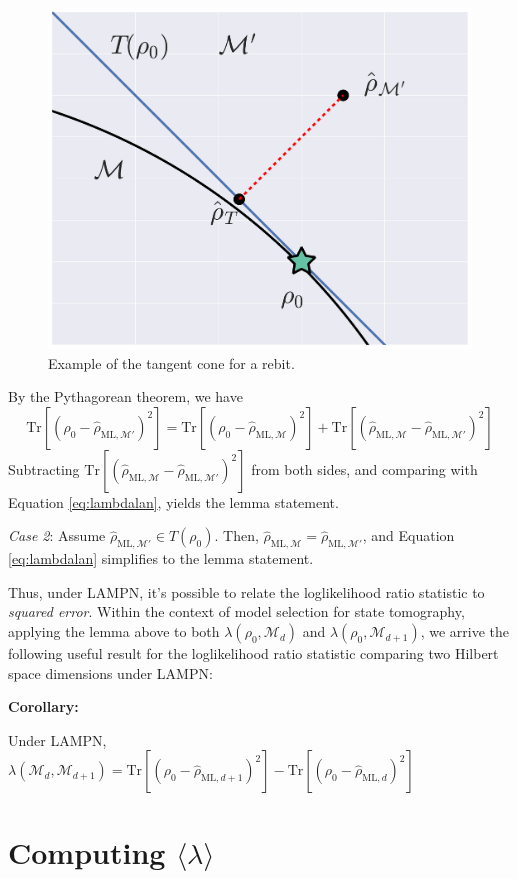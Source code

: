 \documentclass[aps,pra, twocolumn]{revtex4-1}
\newcommand{\M}{\mathcal{M}}
\newcommand{\rhohat}{\hat{\rho}}
\newcommand{\rhoML}[1]{\rhohat_{\scriptscriptstyle{\mathrm{ML},#1}}}
\begin{document}
\begin{figure}
\includegraphics[width=\columnwidth]{Images/Figure_temp.pdf}
 \caption{Example of the tangent cone for a rebit.}
\label{fig:tangentcone}
\end{figure}

 By the Pythagorean theorem, we have
\[\mathrm{Tr}[(\rho_{0} -\rhoML{\M'})^{2}] =  \mathrm{Tr}[(\rho_{0} - \rhoML{\M})^{2}] + \mathrm{Tr}[(\rhoML{\M} - \rhoML{\M'})^{2}]\]
Subtracting $\mathrm{Tr}[(\rhoML{\M} - \rhoML{\M'})^{2}]$ from both sides, and comparing with Equation \eqref{eq:lambdalan}, yields the lemma statement.

\emph{Case 2}: Assume $\rhoML{\M'} \in T(\rho_{0})$. Then, $\rhoML{\M}= \rhoML{\M'}$, and Equation \eqref{eq:lambdalan} simplifies to the lemma statement.

Thus, under LAMPN, it's possible to relate the loglikelihood ratio statistic to \emph{squared error}. Within the context of model selection for state tomography, applying the lemma above to both $\lambda(\rho_{0},\M_{d})$ and $\lambda(\rho_{0},\M_{d+1})$, we arrive the following useful result for the loglikelihood ratio statistic comparing two Hilbert space dimensions under LAMPN:

\textbf{Corollary:}

Under LAMPN, $\lambda(\M_{d}, \M_{d+1}) = \mathrm{Tr}[(\rho_{0} - \rhoML{d+1})^{2}] -\mathrm{Tr}[(\rho_{0} - \rhoML{d})^{2}]$

\section{Computing $\langle \lambda \rangle$}
\label{sec:computingllrs}
\end{document}
